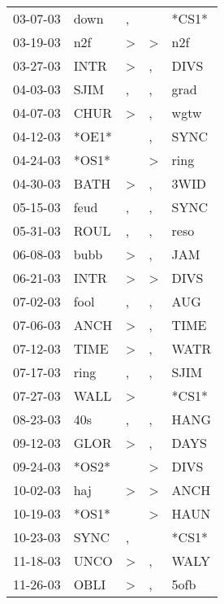 \begin{supertabular}{lllll}
 03-07-03 &   down &                , &               &  *CS1* \\
 03-19-03 &    n2f &     \textgreater &  \textgreater &    n2f \\
 03-27-03 &   INTR &     \textgreater &             , &   DIVS \\
 04-03-03 &   SJIM &                , &             , &   grad \\
 04-07-03 &   CHUR &     \textgreater &             , &   wgtw \\
 04-12-03 &  *OE1* &                  &             , &   SYNC \\
 04-24-03 &  *OS1* &                  &  \textgreater &   ring \\
 04-30-03 &   BATH &     \textgreater &             , &   3WID \\
 05-15-03 &   feud &                , &             , &   SYNC \\
 05-31-03 &   ROUL &                , &             , &   reso \\
 06-08-03 &   bubb &     \textgreater &             , &    JAM \\
 06-21-03 &   INTR &     \textgreater &  \textgreater &   DIVS \\
 07-02-03 &   fool &                , &             , &    AUG \\
 07-06-03 &   ANCH &     \textgreater &             , &   TIME \\
 07-12-03 &   TIME &     \textgreater &             , &   WATR \\
 07-17-03 &   ring &                , &             , &   SJIM \\
 07-27-03 &   WALL &     \textgreater &               &  *CS1* \\
 08-23-03 &    40s &                , &             , &   HANG \\
 09-12-03 &   GLOR &     \textgreater &             , &   DAYS \\
 09-24-03 &  *OS2* &                  &  \textgreater &   DIVS \\
 10-02-03 &    haj &     \textgreater &  \textgreater &   ANCH \\
 10-19-03 &  *OS1* &                  &  \textgreater &   HAUN \\
 10-23-03 &   SYNC &                , &               &  *CS1* \\
 11-18-03 &   UNCO &     \textgreater &             , &   WALY \\
 11-26-03 &   OBLI &     \textgreater &             , &   5ofb \\

\end{supertabular}
